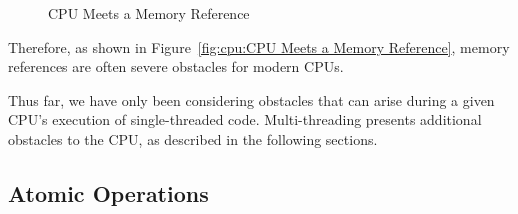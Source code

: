 \begin{figure}[htb]
\begin{center}
\end{center}
\caption{CPU Meets a Memory Reference}
\end{figure}

Therefore, as shown in
Figure~\ref{fig:cpu:CPU Meets a Memory Reference},
memory references are often severe obstacles for modern CPUs.

Thus far, we have only been considering obstacles that can arise during
a given CPU's execution of single-threaded code.
Multi-threading presents additional obstacles to the CPU, as
described in the following sections.

\subsection{Atomic Operations}
\label{sec:cpu:Atomic Operations}

